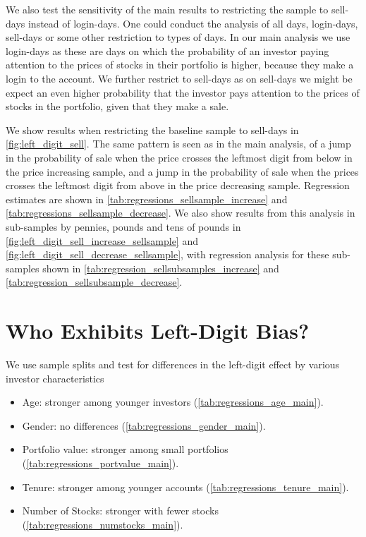 We also test the sensitivity of the main results to restricting the sample to sell-days instead of login-days. One could conduct the analysis of all days, login-days, sell-days or some other restriction to types of days. In our main analysis we use login-days as these are days on which the probability of an investor paying attention to the prices of stocks in their portfolio is higher, because they make a login to the account. We further restrict to sell-days as on sell-days we might be expect an even higher probability that the investor pays attention to the prices of stocks in the portfolio, given that they make a sale.

We show results when restricting the baseline sample to sell-days in  \ref{fig:left_digit_sell}. The same pattern is seen as in the main analysis, of a jump in the probability of sale when the price crosses the leftmost digit from below in the price increasing sample, and a jump in the probability of sale when the prices crosses the leftmost digit from above in the price decreasing sample. Regression estimates are shown in \ref{tab:regressions_sellsample_increase} and \ref{tab:regressions_sellsample_decrease}. We also show results from this analysis in sub-samples by pennies, pounds and tens of pounds in \ref{fig:left_digit_sell_increase_sellsample} and \ref{fig:left_digit_sell_decrease_sellsample}, with regression analysis for these sub-samples shown in \ref{tab:regression_sellsubsamples_increase} and \ref{tab:regression_sellsubsample_decrease}.

\section{Who Exhibits Left-Digit Bias?} 

We use sample splits and test for differences in the left-digit effect by various investor characteristics
\begin{itemize}
	\item Age: stronger among younger investors (\ref{tab:regressions_age_main}).
	\item Gender: no differences (\ref{tab:regressions_gender_main}).
	\item Portfolio value: stronger among small portfolios (\ref{tab:regressions_portvalue_main}).
	\item Tenure: stronger among younger accounts (\ref{tab:regressions_tenure_main}).
	\item Number of Stocks: stronger with fewer stocks (\ref{tab:regressions_numstocks_main}).
\end{itemize}



